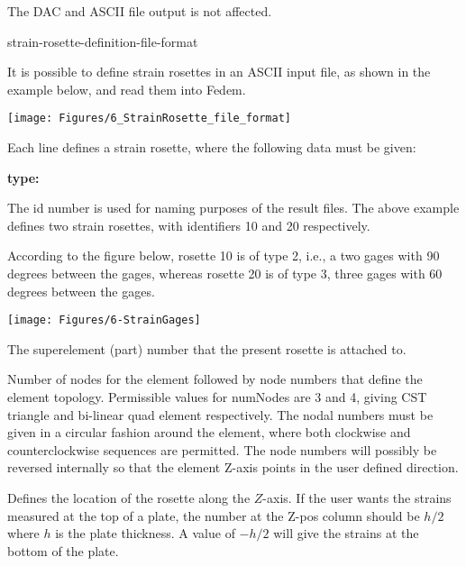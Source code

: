 The DAC and ASCII file output is not affected.

\clearpage


           {strain-rosette-definition-file-format}

It is possible to define strain rosettes in an ASCII input file, as
shown in the example below, and read them into Fedem.

\noindent
\texttt{[image: Figures/6\_StrainRosette\_file\_format]}

Each line defines a strain rosette, where the following data must be given:
%
\begin{namelist}{\bf type:}
\item[\sl\textbf{id:}]
  The id number is used for naming purposes of the result files.
  The above example defines two strain rosettes,
  with identifiers 10 and 20 respectively.

\item[\sl\textbf{type:}]
  According to the figure below, rosette 10 is of type 2, i.e., a two gages
  with 90 degrees between the gages, whereas rosette 20 is of type 3,
  three gages with 60 degrees between the gages.

  \hspace*{-0.33\textwidth}
  \texttt{[image: Figures/6-StrainGages]}

\item[\sl\textbf{link:}]
  The superelement (part) number that the present rosette is attached to.

\item[\sl\textbf{numNodes n1 n2 n3 (n4):}]
  Number of nodes for the element followed by node numbers that define the
  element topology. Permissible values for numNodes are 3 and 4,
  giving CST triangle and bi-linear quad element respectively.
  The nodal numbers must be given in a circular fashion around the element,
  where both clockwise and counterclockwise sequences are permitted.
  The node numbers will possibly be reversed internally so that the element
  Z-axis points in the user defined direction.

\item[\sl\textbf{zPos:}]
  Defines the location of the rosette along the $Z$-axis.
  If the user wants the strains measured at the top of a plate, the number at
  the Z-pos column should be $h/2$ where $h$ is the plate thickness.
  A value of $-h/2$ will give the strains at the bottom of the plate.


\end{namelist}
